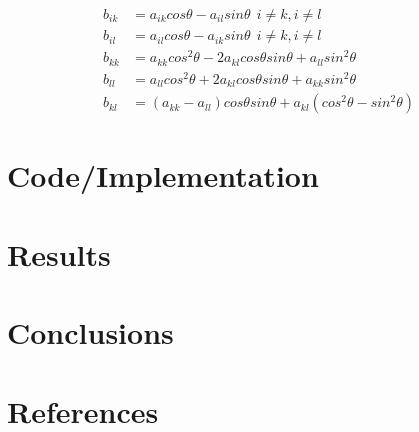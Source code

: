\documentclass[12pt]{article}
\begin{document}
\begin{align*}
    b_{ik} &= a_{ik}cos\theta-a_{il}sin\theta\ \ i\neq k, i \neq l\\
    b_{il} &= a_{il}cos\theta-a_{ik}sin\theta\ \ i\neq k, i \neq l\\
    b_{kk} &= a_{kk}cos^2\theta-2a_{kl}cos\theta sin\theta + a_ {ll}sin^2\theta\\
    b_{ll} &= a_{ll}cos^2\theta+2a_{kl}cos\theta sin\theta + a_ {kk}sin^2\theta\\
    b_ {kl} &= (a_{kk}-a_{ll})cos\theta sin\theta +a_{kl}(cos^2\theta-sin^2\theta)
\end{align*}


\section*{Code/Implementation}
\section*{Results}
\section*{Conclusions}
\section*{References}
\end{document}
